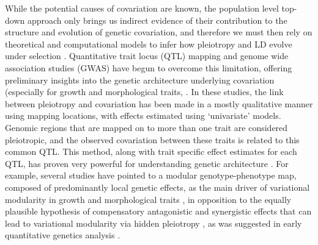 \begin{refsection}
While the potential causes of covariation are known, the population
level top-down approach only brings us indirect evidence of their
contribution to the structure and evolution of genetic covariation, and
therefore we must then rely on theoretical and computational models to
infer how pleiotropy and LD evolve under selection \parencite{Barton1990-uu,Hansen2006-yc,Pavlicev2011-wz,Melo2015-bk}.
Quantitative trait locus (QTL) mapping and genome wide association
studies (GWAS) have begun to overcome this limitation, offering
preliminary insights into the genetic architecture underlying
covariation (especially for growth and morphological traits, \parencite{Leamy2002-nh,Wolf2005-nr,Kenney-Hunt2008-bd,Porto2016-qc}.
In these studies, the link between pleiotropy and covariation has been
made in a mostly qualitative manner using mapping locations, with
effects estimated using `univariate' models. Genomic regions that are
mapped on to more than one trait are considered pleiotropic, and the
observed covariation between these traits is related to this common QTL.
This method, along with trait specific effect estimates for each QTL,
has proven very powerful for understanding genetic architecture \parencite{Wang2010-da,Wagner2011-kp}.
For example, several studies have pointed to a
modular genotype-phenotype map, composed of predominantly local genetic
effects, as the main driver of variational modularity in growth and
morphological traits \parencite{Leamy2002-nh,Cheverud1996-fm,Mezey2000-rs},
in opposition to the equally
plausible hypothesis of compensatory antagonistic and synergistic effects
 that can lead to variational modularity via hidden pleiotropy \parencite{Pavlicev2011-xm},
as was suggested in early quantitative genetics analysis \parencite{Cheverud1983-fq}.


\end{refsection}
